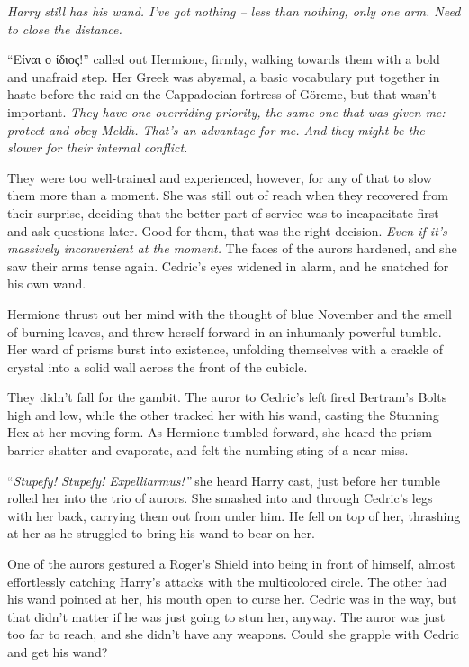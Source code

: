\emph{Harry still has his wand. I've got nothing -- less than nothing,
only one arm. Need to close the distance.}

``\foreignlanguage{greek}{\textgreek{Είναι ο ίδιος}}!'' called out
Hermione, firmly, walking towards them with a bold and unafraid step.
Her Greek was abysmal, a basic vocabulary put together in haste before
the raid on the Cappadocian fortress of Göreme, but that wasn't
important. \emph{They have one overriding priority, the same one that
was given me: protect and obey Meldh. That's an advantage for me. And
they might be the slower for their internal conflict.}

They were too well-trained and experienced, however, for any of that to
slow them more than a moment. She was still out of reach when they
recovered from their surprise, deciding that the better part of service
was to incapacitate first and ask questions later. Good for them, that
was the right decision. \emph{Even if it's massively inconvenient at the
moment.} The faces of the aurors hardened, and she saw their arms tense
again. Cedric's eyes widened in alarm, and he snatched for his own wand.

Hermione thrust out her mind with the thought of blue November and the
smell of burning leaves, and threw herself forward in an inhumanly
powerful tumble. Her ward of prisms burst into existence, unfolding
themselves with a crackle of crystal into a solid wall across the front
of the cubicle.

They didn't fall for the gambit. The auror to Cedric's left fired
Bertram's Bolts high and low, while the other tracked her with his wand,
casting the Stunning Hex at her moving form. As Hermione tumbled
forward, she heard the prism-barrier shatter and evaporate, and felt the
numbing sting of a near miss.

``\emph{Stupefy! Stupefy! Expelliarmus!''} she heard Harry cast, just
before her tumble rolled her into the trio of aurors. She smashed into
and through Cedric's legs with her back, carrying them out from under
him. He fell on top of her, thrashing at her as he struggled to bring
his wand to bear on her.

One of the aurors gestured a Roger's Shield into being in front of
himself, almost effortlessly catching Harry's attacks with the
multicolored circle. The other had his wand pointed at her, his mouth
open to curse her. Cedric was in the way, but that didn't matter if he
was just going to stun her, anyway. The auror was just too far to reach,
and she didn't have any weapons. Could she grapple with Cedric and get
his wand?

